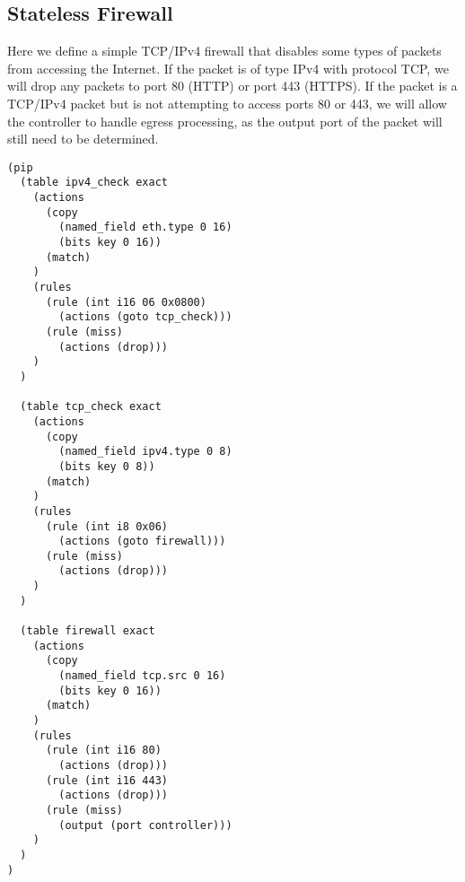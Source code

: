 \subsection{Stateless Firewall}
Here we define a simple TCP/IPv4 firewall that disables some types of packets from accessing the Internet. If the packet is of type IPv4 with protocol TCP, we will drop any packets to port 80 (HTTP) or port 443 (HTTPS). If the packet is a TCP/IPv4 packet but is not attempting to access ports 80 or 443, we will allow the controller to handle egress processing, as the output port of the packet will still need to be determined.
\begin{verbatim}
(pip
  (table ipv4_check exact
    (actions
      (copy 
        (named_field eth.type 0 16)
        (bits key 0 16))
      (match)
    )
    (rules
      (rule (int i16 06 0x0800)
        (actions (goto tcp_check)))
      (rule (miss)
        (actions (drop)))
    )
  )

  (table tcp_check exact
    (actions
      (copy 
        (named_field ipv4.type 0 8)
        (bits key 0 8))
      (match)
    )
    (rules
      (rule (int i8 0x06)
        (actions (goto firewall)))
      (rule (miss)
        (actions (drop)))
    )
  )

  (table firewall exact
    (actions
      (copy
        (named_field tcp.src 0 16)
        (bits key 0 16))
      (match)
    )
    (rules
      (rule (int i16 80)
        (actions (drop)))
      (rule (int i16 443)
        (actions (drop)))
      (rule (miss)
        (output (port controller)))
    )
  )
)
\end{verbatim}
